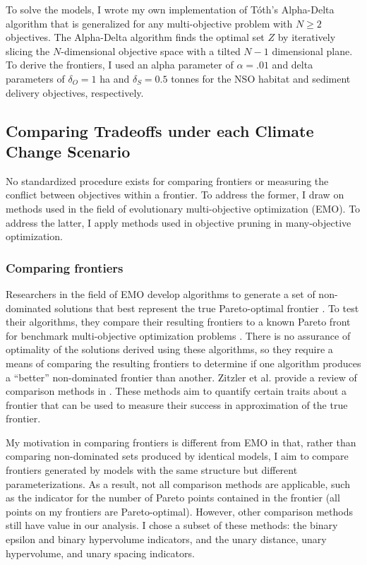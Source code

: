 To solve the models, I wrote my own implementation of T\'{o}th's Alpha-Delta algorithm \cite{TothThesis} that is generalized for any multi-objective problem with $N \ge 2$ objectives. The Alpha-Delta algorithm finds the optimal set $Z$ by iteratively slicing the $N$-dimensional objective space with a tilted $N-1$ dimensional plane. To derive the frontiers, I used an alpha parameter of $\alpha = .01$ and delta parameters of $\delta_{O} = 1$ ha and $\delta_S = 0.5$ tonnes for the NSO habitat and sediment delivery objectives, respectively.

\subsection{Comparing Tradeoffs under each Climate Change Scenario}

No standardized procedure exists for comparing frontiers or measuring the conflict between objectives within a frontier. To address the former, I draw on methods used in the field of evolutionary multi-objective optimization (EMO). To address the latter, I apply methods used in objective pruning in many-objective optimization.

\subsubsection{Comparing frontiers}
Researchers in the field of EMO develop algorithms to generate a set of non-dominated solutions that best represent the true Pareto-optimal frontier \cite{deb2001multi}. To test their algorithms, they compare their resulting frontiers to a known Pareto front for benchmark multi-objective optimization problems \cite{knowles2002metrics}. There is no assurance of optimality of the solutions derived using these algorithms, so they require a means of comparing the resulting frontiers to determine if one algorithm produces a ``better'' non-dominated frontier than another. Zitzler et al. provide a review of comparison methods in \cite{zitzler2003performance}. These methods aim to quantify certain traits about a frontier that can be used to measure their success in approximation of the true frontier.

My motivation in comparing frontiers is different from EMO in that, rather than comparing non-dominated sets produced by identical models, I aim to compare frontiers generated by models with the same structure but different parameterizations. As a result, not all comparison methods are applicable, such as the indicator for the number of Pareto points contained in the frontier (all points on my frontiers are Pareto-optimal). However, other comparison methods still have value in our analysis. I chose a subset of these methods: the binary epsilon and binary hypervolume indicators, and the unary distance, unary hypervolume, and unary spacing indicators.

